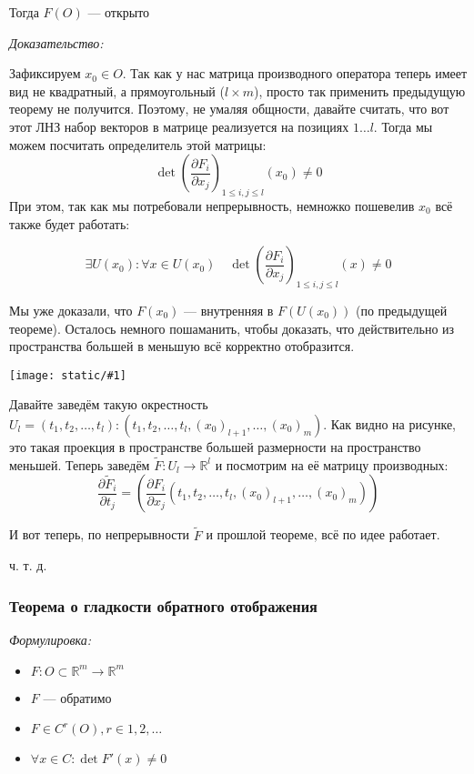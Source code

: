 \documentclass{article}
\def\image#1{\texttt{[image: static/\#1]}}
\begin{document}
Тогда $F(O)$ --- открыто

\textit{Доказательство:}

Зафиксируем $x_0 \in O$. Так как у нас матрица производного оператора теперь имеет вид не квадратный, а прямоугольный ($l \times m$), просто так применить предыдущую теорему не получится. Поэтому, не умаляя общности, давайте считать, что вот этот ЛНЗ набор векторов в матрице реализуется на позициях $1 \ldots l$.
Тогда мы можем посчитать определитель этой матрицы: $$\det \left(\frac{\partial F_i}{\partial x_j}\right)_{1 \le i, j \le l}(x_0) \neq 0$$
При этом, так как мы потребовали непрерывность, немножко пошевелив $x_0$ всё также будет работать:

\[\exists U(x_0): \forall x \in U(x_0) \quad \det \left(\frac{\partial F_i}{\partial x_j}\right)_{1 \le i, j \le l}(x) \neq 0\]

Мы уже доказали, что $F(x_0)$ --- внутренняя в $F(U(x_0))$ (по предыдущей теореме). Осталось немного пошаманить, чтобы доказать, что действительно из пространства большей в меньшую всё корректно отобразится.

\image{sohr_obl_men_raz.png}

Давайте заведём такую окрестность $U_l = {(t_1, t_2, \ldots, t_l): (t_1, t_2, \ldots, t_l, (x_0)_{l + 1}, \ldots, (x_0)_m)}$. Как видно на рисунке, это такая проекция в пространстве большей размерности на пространство меньшей. Теперь заведём $\widetilde{F}: U_l \rightarrow \mathbb{R}^l$ и посмотрим на её матрицу производных: $$\frac{\partial \widetilde{F}_i}{\partial t_j} = \left(\frac{\partial F_i}{\partial x_j}(t_1, t_2, \ldots, t_l, (x_0)_{l + 1}, \ldots, (x_0)_m)\right)$$

И вот теперь, по непрерывности $\widetilde{F}$ и прошлой теореме, всё по идее работает.

ч. т. д.

\subsubsection{Теорема о гладкости обратного отображения}
\textit{Формулировка:}

\begin{itemize}
    \item $F: O \subset \mathbb{R}^m \rightarrow \mathbb{R}^m$
    \item $F$ --- обратимо
    \item $F \in C^r(O), r \in 1, 2, \ldots$
    \item $\forall x \in C: \det F'(x) \neq 0$
\end{itemize}
\end{document}
